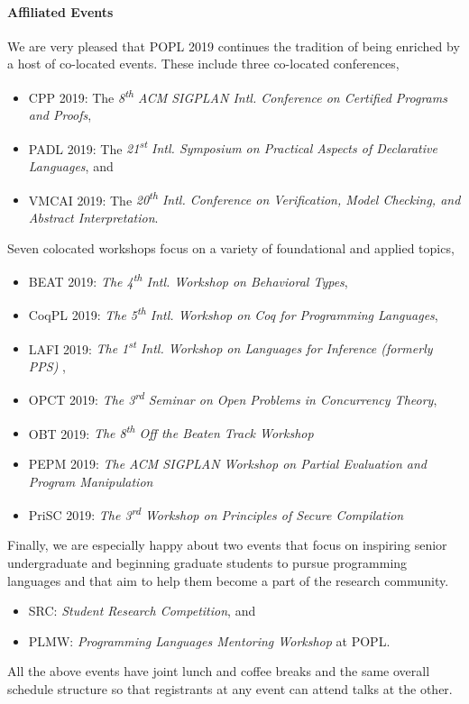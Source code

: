 \paragraph{Affiliated Events}
%
We are very pleased that POPL 2019 continues the tradition of being enriched
by a host of co-located events.
%
These include three co-located conferences,
%
\begin{itemize}
  \item CPP 2019:   The \emph{8\textsuperscript{th} ACM SIGPLAN Intl. Conference on Certified Programs and Proofs},
  \item PADL 2019:  The \emph{21\textsuperscript{st} Intl. Symposium on Practical Aspects of Declarative Languages}, and
  \item VMCAI 2019: The \emph{20\textsuperscript{th} Intl. Conference on Verification, Model Checking, and Abstract Interpretation}.
\end{itemize}
%
Seven colocated workshops focus on a variety of foundational and applied topics,
%
\begin{itemize}
  \item BEAT 2019: \emph{The 4\textsuperscript{th} Intl. Workshop on Behavioral Types},
  \item CoqPL 2019: \emph{The 5\textsuperscript{th} Intl. Workshop on Coq for Programming Languages},
  \item LAFI 2019: \emph{The 1\textsuperscript{st} Intl. Workshop on Languages for Inference (formerly PPS) },
  \item OPCT 2019:   \emph{The 3\textsuperscript{rd} Seminar on Open Problems in Concurrency Theory},
  \item OBT 2019:   \emph{The 8\textsuperscript{th} Off the Beaten Track Workshop}
  \item PEPM 2019:  \emph{The ACM SIGPLAN Workshop on Partial Evaluation and Program Manipulation}
  \item PriSC 2019: \emph{The 3\textsuperscript{rd} Workshop on Principles of Secure Compilation}
\end{itemize}
%
Finally, we are especially happy about two events that
focus on inspiring senior undergraduate and beginning
graduate students to pursue programming languages and
that aim to help them become a part of the research
community.
%
\begin{itemize}
\item SRC: \emph{Student Research Competition}, and
\item PLMW: \emph{Programming Languages Mentoring Workshop} at POPL.
\end{itemize}
%
All the above events have joint lunch and coffee breaks
and the same overall schedule structure so that registrants
at any event can attend talks at the other.

